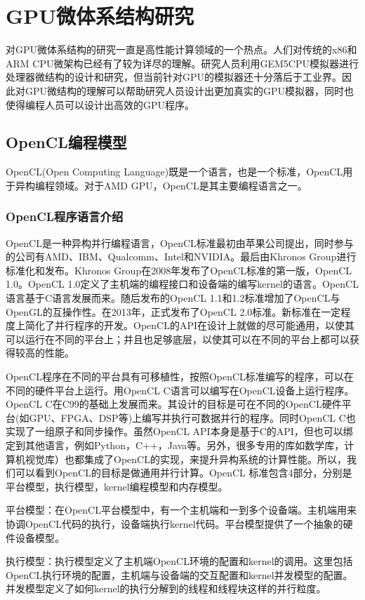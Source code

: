 \chapter{GPU微体系结构研究}\label{chap:GPUArch}
对GPU微体系结构的研究一直是高性能计算领域的一个热点。人们对传统的x86和ARM CPU微架构已经有了较为详尽的理解。研究人员利用GEM5CPU模拟器进行处理器微结构的设计和研究，但当前针对GPU的模拟器还十分落后于工业界。因此对GPU微结构的理解可以帮助研究人员设计出更加真实的GPU模拟器，同时也使得编程人员可以设计出高效的GPU程序。
\section{OpenCL编程模型}
OpenCL(Open Computing Language)既是一个语言，也是一个标准，OpenCL用于异构编程领域。对于AMD GPU，OpenCL是其主要编程语言之一。

\subsection{OpenCL程序语言介绍}
OpenCL是一种异构并行编程语言，OpenCL标准最初由苹果公司提出，同时参与的公司有AMD、IBM、Qualcomm、Intel和NVIDIA。最后由Khronos Group进行标准化和发布。Khronos Group在2008年发布了OpenCL标准的第一版，OpenCL 1.0。OpenCL 1.0定义了主机端的编程接口和设备端的编写kernel的语言。OpenCL语言基于C语言发展而来。随后发布的OpenCL 1.1和1.2标准增加了OpenCL与OpenGL的互操作性。在2013年，正式发布了OpenCL 2.0标准。新标准在一定程度上简化了并行程序的开发。OpenCL的API在设计上就做的尽可能通用，以使其可以运行在不同的平台上；并且也足够底层，以使其可以在不同的平台上都可以获得较高的性能。

OpenCL程序在不同的平台具有可移植性，按照OpenCL标准编写的程序，可以在不同的硬件平台上运行。用OpenCL C语言可以编写在OpenCL设备上运行程序。OpenCL C在C99的基础上发展而来。其设计的目标是可在不同的OpenCL硬件平台(如GPU、FPGA、DSP等)上编写并执行可数据并行的程序。同时OpenCL C也实现了一组原子和同步操作。虽然OpenCL API本身是基于C的API，但也可以绑定到其他语言，例如Python，C++，Java等。另外，很多专用的库如数学库，计算机视觉库）也都集成了OpenCL的实现，来提升异构系统的计算性能。所以，我们可以看到OpenCL的目标是做通用并行计算。OpenCL 标准包含4部分，分别是平台模型，执行模型，kernel编程模型和内存模型。

平台模型：在OpenCL平台模型中，有一个主机端和一到多个设备端。主机端用来协调OpenCL代码的执行，设备端执行kernel代码。平台模型提供了一个抽象的硬件设备模型。

执行模型：执行模型定义了主机端OpenCL环境的配置和kernel的调用。这里包括OpenCL执行环境的配置，主机端与设备端的交互配置和kernel并发模型的配置。并发模型定义了如何kernel的执行分解到的线程和线程块这样的并行粒度。

